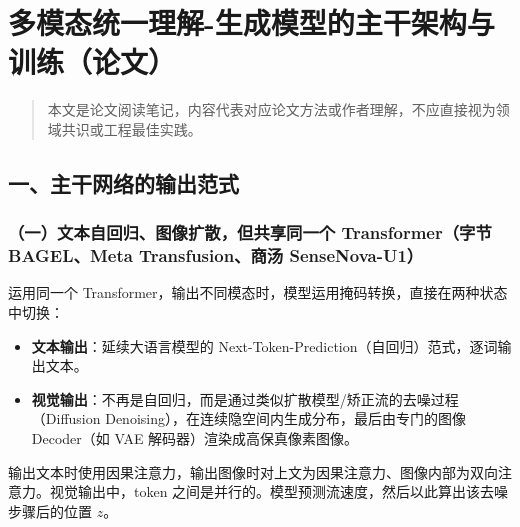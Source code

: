 \clearpage

\hypertarget{ux591aux6a21ux6001ux7edfux4e00ux7406ux89e3-ux751fux6210ux6a21ux578bux7684ux4e3bux5e72ux67b6ux6784ux4e0eux8badux7ec3ux8bbaux6587}{%
\section{多模态统一理解-生成模型的主干架构与训练（论文）}\label{ux591aux6a21ux6001ux7edfux4e00ux7406ux89e3-ux751fux6210ux6a21ux578bux7684ux4e3bux5e72ux67b6ux6784ux4e0eux8badux7ec3ux8bbaux6587}}

\begin{quote}
本文是论文阅读笔记，内容代表对应论文方法或作者理解，不应直接视为领域共识或工程最佳实践。
\end{quote}

\hypertarget{ux4e00ux4e3bux5e72ux7f51ux7edcux7684ux8f93ux51faux8303ux5f0f}{%
\subsection{一、主干网络的输出范式}\label{ux4e00ux4e3bux5e72ux7f51ux7edcux7684ux8f93ux51faux8303ux5f0f}}

\hypertarget{ux4e00ux6587ux672cux81eaux56deux5f52ux56feux50cfux6269ux6563ux4f46ux5171ux4eabux540cux4e00ux4e2a-transformerux5b57ux8282-bagelmeta-transfusionux5546ux6c64-sensenova-u1}{%
\subsubsection{（一）文本自回归、图像扩散，但共享同一个 Transformer（字节 BAGEL、Meta Transfusion、商汤 SenseNova-U1）}\label{ux4e00ux6587ux672cux81eaux56deux5f52ux56feux50cfux6269ux6563ux4f46ux5171ux4eabux540cux4e00ux4e2a-transformerux5b57ux8282-bagelmeta-transfusionux5546ux6c64-sensenova-u1}}

运用同一个 Transformer，输出不同模态时，模型运用掩码转换，直接在两种状态中切换：

\begin{itemize}
\tightlist
\item
  \textbf{文本输出}：延续大语言模型的 Next-Token-Prediction（自回归）范式，逐词输出文本。
\item
  \textbf{视觉输出}：不再是自回归，而是通过类似扩散模型/矫正流的去噪过程（Diffusion Denoising），在连续隐空间内生成分布，最后由专门的图像 Decoder（如 VAE 解码器）渲染成高保真像素图像。
\end{itemize}

输出文本时使用因果注意力，输出图像时对上文为因果注意力、图像内部为双向注意力。视觉输出中，token 之间是并行的。模型预测流速度，然后以此算出该去噪步骤后的位置 \(z\)。

